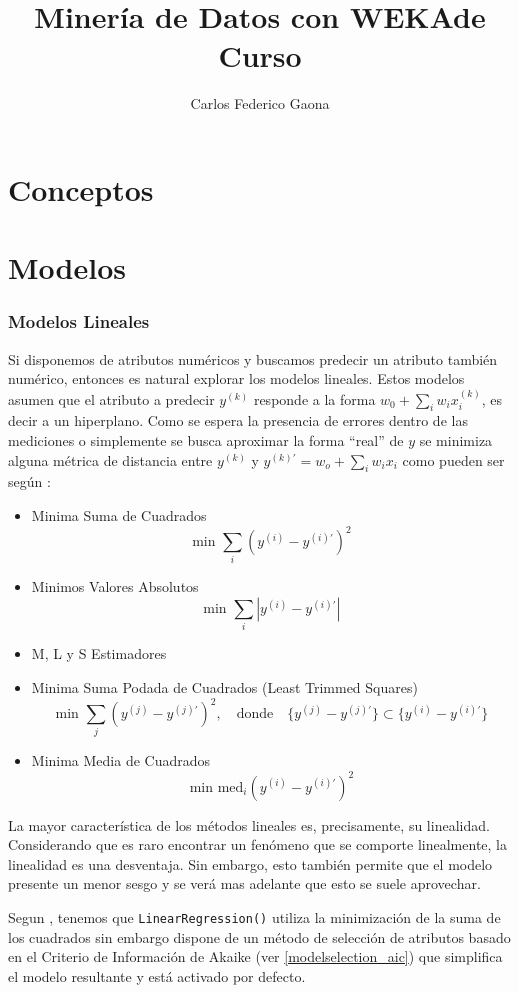 \documentclass[10pt,a4paper]{article}
\author{Carlos Federico Gaona}
\title{Minería de Datos con WEKA\nNotas de Curso}
\date{}
\begin{document}
\part{Conceptos}
\part{Modelos}
\section{Modelos Lineales}
Si disponemos de atributos numéricos y buscamos predecir un atributo también numérico, entonces es natural explorar los modelos lineales. Estos modelos asumen que el atributo a predecir $y^{(k)}$ responde a la forma $w_0 + \sum_i w_ix_i^{(k)}$, es decir a un hiperplano. Como se espera la presencia de errores dentro de las mediciones o simplemente se busca aproximar la forma ``real'' de $y$ se minimiza alguna métrica de distancia entre $y^{(k)}$ y $y^{(k)'} = w_o + \sum_i w_ix_i$ como pueden ser según \cite{ruppert1980trimmed}:

\begin{itemize}
\item Minima Suma de Cuadrados
  \[
  \text{min }\sum_i (y^{(i)}-y^{(i)'})^2
  \]
\item Minimos Valores Absolutos
  \[
  \text{min }\sum_i |y^{(i)}-y^{(i)'}|
  \]
\item M, L y S Estimadores
\item Minima Suma Podada de Cuadrados (Least Trimmed Squares)
  \[
  \text{min }\sum_j (y^{(j)}-y^{(j)'})^2, \quad \text{donde} \quad \{ y^{(j)}-y^{(j)'} \} \subset \{ y^{(i)}-y^{(i)'} \}
  \]
\item Minima Media de Cuadrados
  \[
  \text{min }\text{med}_i (y^{(i)}-y^{(i)'})^2
  \]
\end{itemize}

La mayor característica de los métodos lineales es, precisamente, su linealidad. Considerando que es raro encontrar un fenómeno que se comporte linealmente, la linealidad es una desventaja. Sin embargo, esto también permite que el modelo presente un menor sesgo y se verá mas adelante que esto se suele aprovechar.


Segun \cite{witten2011data}, tenemos que \lstinline{LinearRegression()} utiliza la minimización de la suma de los cuadrados sin embargo dispone de un método de selección de atributos basado en el Criterio de Información de Akaike (ver \ref{modelselection_aic}) que simplifica el modelo resultante y está activado por defecto.
\end{document}
